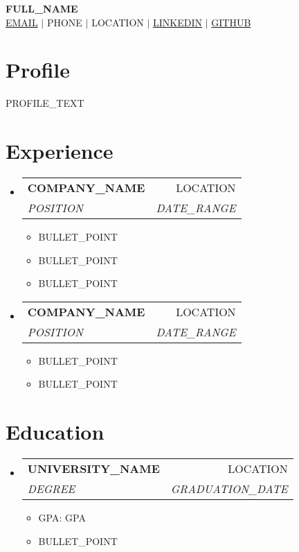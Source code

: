 \documentclass[letterpaper,11pt]{article}
\makeatletter
\newcommand{\resumeItem}[1]{
  \item\small{#1}
}
\newcommand{\resumeSubheading}[4]{
  \vspace{1pt}
  \item
    \begin{tabular*}{0.97\textwidth}[t]{l@{\extracolsep{\fill}}r}
      \textbf{#1} & #2 \\
      \textit{#3} & \textit{#4} \\
    \end{tabular*}\vspace{1pt}
}
\makeatother
\begin{document}
\begin{center}
    \textbf{\Large \scshape {FULL\_NAME}} \\ \vspace{2pt}
    \small
     \href{mailto:{EMAIL}}{{EMAIL}} $|$ 
     {PHONE} $|$ 
     {LOCATION} $|$ 
     \href{https://linkedin.com/in/{LINKEDIN}}{{LINKEDIN}} $|$ 
     \href{https://github.com/{GITHUB}}{{GITHUB}}
\end{center}

\section{Profile}
{\small {PROFILE\_TEXT}}

\section{Experience}
\begin{itemize}[leftmargin=0.15in, label={}]
    \resumeSubheading
      {COMPANY\_NAME}{LOCATION}
      {POSITION}{DATE\_RANGE}
      \begin{itemize}[leftmargin=0.15in, label=\textbullet]
        \resumeItem{BULLET\_POINT}
        \resumeItem{BULLET\_POINT}
        \resumeItem{BULLET\_POINT}
      \end{itemize}
    
    \resumeSubheading
      {COMPANY\_NAME}{LOCATION}
      {POSITION}{DATE\_RANGE}
      \begin{itemize}[leftmargin=0.15in, label=\textbullet]
        \resumeItem{BULLET\_POINT}
        \resumeItem{BULLET\_POINT}
      \end{itemize}
\end{itemize}

\section{Education}
\begin{itemize}[leftmargin=0.15in, label={}]
    \resumeSubheading
      {UNIVERSITY\_NAME}{LOCATION}
      {DEGREE}{GRADUATION\_DATE}
      \begin{itemize}[leftmargin=0.15in, label=\textbullet]
        \resumeItem{GPA: {GPA}}
        \resumeItem{BULLET\_POINT}
      \end{itemize}
\end{itemize}
\end{document}
